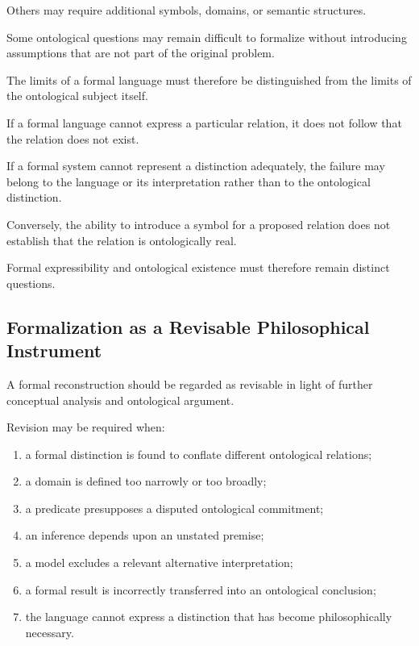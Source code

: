 Others may
require additional
symbols, domains,
or semantic
structures.

Some ontological
questions may
remain difficult
to formalize
without introducing
assumptions that
are not
part of
the original
problem.

The limits
of a
formal language
must therefore
be distinguished
from the
limits of
the ontological
subject itself.

If a
formal language
cannot express
a particular
relation, it
does not
follow that
the relation
does not
exist.

If a
formal system
cannot represent
a distinction
adequately, the
failure may
belong to
the language
or its
interpretation rather
than to
the ontological
distinction.

Conversely, the
ability to
introduce a
symbol for
a proposed
relation does
not establish
that the
relation is
ontologically real.

Formal expressibility
and ontological
existence must
therefore remain
distinct questions.

\subsection{Formalization as a Revisable Philosophical Instrument}

A formal
reconstruction should
be regarded
as revisable
in light
of further
conceptual analysis
and ontological
argument.

Revision may
be required
when:

\begin{enumerate}
    \item a formal
    distinction
    is found
    to conflate
    different
    ontological
    relations;
    \item a domain
    is defined
    too narrowly
    or too
    broadly;
    \item a predicate
    presupposes
    a disputed
    ontological
    commitment;
    \item an inference
    depends upon
    an unstated
    premise;
    \item a model
    excludes
    a relevant
    alternative
    interpretation;
    \item a formal
    result is
    incorrectly
    transferred
    into an
    ontological
    conclusion;
    \item the language
    cannot express
    a distinction
    that has
    become
    philosophically
    necessary.
\end{enumerate}

